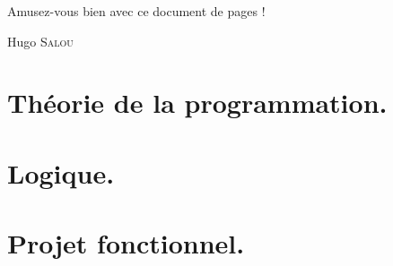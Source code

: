 \documentclass{notes}
\begin{document}
  Amusez-vous bien avec ce document de \pageref*{LastPage} pages !

  \hfill Hugo \textsc{Salou}

  \part{Théorie de la programmation.}

  
  
  
  
  
  
  
  
  
  
  

  \part{Logique.}

  
  
  
  
  
  

  \part{Projet fonctionnel.}

  
  
  
  
  
  
\end{document}
